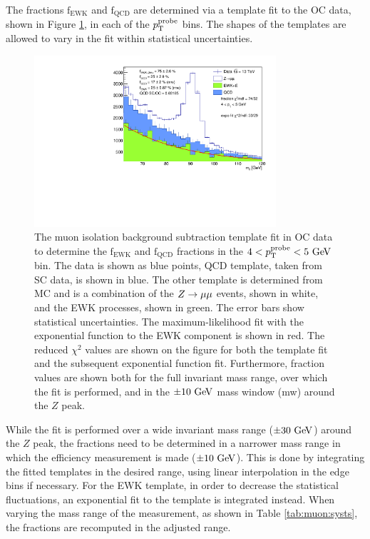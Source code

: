 The fractions $\text{f}_\text{EWK}$ and $\text{f}_\text{QCD}$ are
determined via a template fit to the OC data, shown in Figure
\ref{fig:muon:fit}, in each of the $p_{\text{T}}^\text{probe}$ bins.
The shapes of the templates are allowed to vary in the fit within
statistical uncertainties.
\begin{figure}[h!]
  \centering
  \includegraphics[width=0.8\textwidth]{figures/muons/fit}
  \caption[Muon isolation background subtraction fit]{The muon isolation
  background subtraction template fit in OC data to determine the
  $\text{f}_\text{EWK}$ and $\text{f}_\text{QCD}$ fractions in the
  $4 < p_{\text{T}}^\text{probe} < 5~\text{Ge\kern -0.1em V}$ bin.
  The data is shown as blue points, QCD template, taken from SC data, is
  shown in blue. The other template is determined from MC and is a
  combination of the $Z \rightarrow \mu\mu$ events, shown in white, and the EWK
  processes, shown in green. The error bars show statistical
  uncertainties. The maximum-likelihood fit with the exponential
  function to the EWK component is shown in red. The reduced $\chi^2$
  values are shown on the figure for both the template fit and the
  subsequent exponential function fit. Furthermore, fraction values
  are shown both for the full invariant mass range, over which the
  fit is performed, and in the $\pm 10~\text{Ge\kern -0.1em V}$ mass window (mw) around
  the $Z$ peak.}
  \label{fig:muon:fit}
\end{figure}
While the fit is performed over a wide invariant mass range ($\pm30~\text{Ge\kern -0.1em V}$)
around the $Z$ peak, the fractions need to be determined in a narrower
mass range in which the efficiency measurement is made ($\pm10~\text{Ge\kern -0.1em V}$).
This is done by integrating the fitted templates in the desired range,
using linear interpolation in the edge bins if necessary. For the EWK template, in
order to decrease the statistical fluctuations, an exponential fit
to the template is integrated instead. When varying the mass range
of the measurement, as shown in Table \ref{tab:muon:systs}, the fractions
are recomputed in the adjusted range.

